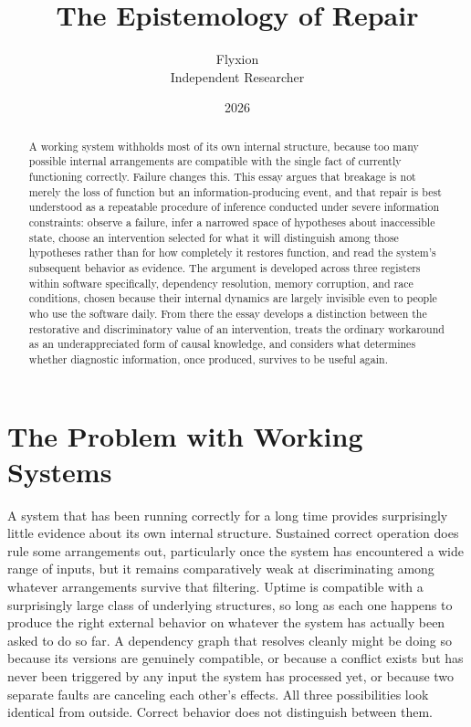 \documentclass[11pt]{article}
\title{The Epistemology of Repair}
\author{Flyxion \\ \small Independent Researcher}
\date{2026}
\begin{document}
\maketitle

\begin{abstract}
A working system withholds most of its own internal structure, because too many possible internal arrangements are compatible with the single fact of currently functioning correctly. Failure changes this. This essay argues that breakage is not merely the loss of function but an information-producing event, and that repair is best understood as a repeatable procedure of inference conducted under severe information constraints: observe a failure, infer a narrowed space of hypotheses about inaccessible state, choose an intervention selected for what it will distinguish among those hypotheses rather than for how completely it restores function, and read the system's subsequent behavior as evidence. The argument is developed across three registers within software specifically, dependency resolution, memory corruption, and race conditions, chosen because their internal dynamics are largely invisible even to people who use the software daily. From there the essay develops a distinction between the restorative and discriminatory value of an intervention, treats the ordinary workaround as an underappreciated form of causal knowledge, and considers what determines whether diagnostic information, once produced, survives to be useful again.
\end{abstract}

\section{The Problem with Working Systems}

A system that has been running correctly for a long time provides surprisingly little evidence about its own internal structure. Sustained correct operation does rule some arrangements out, particularly once the system has encountered a wide range of inputs, but it remains comparatively weak at discriminating among whatever arrangements survive that filtering. Uptime is compatible with a surprisingly large class of underlying structures, so long as each one happens to produce the right external behavior on whatever the system has actually been asked to do so far. A dependency graph that resolves cleanly might be doing so because its versions are genuinely compatible, or because a conflict exists but has never been triggered by any input the system has processed yet, or because two separate faults are canceling each other's effects. All three possibilities look identical from outside. Correct behavior does not distinguish between them.
\end{document}
